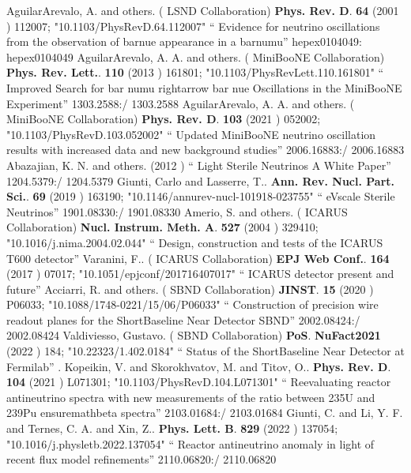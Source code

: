 \documentclass{article}
\begin{document}
\begin{thebibliography}{99}
  AguilarArevalo, A. and others. ( LSND Collaboration) {\bf  Phys. Rev. D}. {\bf  64} (2001 )  112007;  "10.1103/PhysRevD.64.112007" `` Evidence for neutrino oscillations from the observation of barnue appearance in a barnumu'' hepex0104049: hepex0104049
  AguilarArevalo, A. A. and others. ( MiniBooNE Collaboration) {\bf  Phys. Rev. Lett.}. {\bf  110} (2013 )  161801;  "10.1103/PhysRevLett.110.161801" `` Improved Search for bar numu rightarrow bar nue Oscillations in the MiniBooNE Experiment'' 1303.2588:/ 1303.2588
  AguilarArevalo, A. A. and others. ( MiniBooNE Collaboration) {\bf  Phys. Rev. D}. {\bf  103} (2021 )  052002;  "10.1103/PhysRevD.103.052002" `` Updated MiniBooNE neutrino oscillation results with increased data and new background studies'' 2006.16883:/ 2006.16883
  Abazajian, K. N. and others. (2012 ) `` Light Sterile Neutrinos A White Paper'' 1204.5379:/ 1204.5379
  Giunti, Carlo and Lasserre, T.. {\bf  Ann. Rev. Nucl. Part. Sci.}. {\bf  69} (2019 )  163190;  "10.1146/annurev-nucl-101918-023755" `` eVscale Sterile Neutrinos'' 1901.08330:/ 1901.08330
  Amerio, S. and others. ( ICARUS Collaboration) {\bf  Nucl. Instrum. Meth. A}. {\bf  527} (2004 )  329410;  "10.1016/j.nima.2004.02.044" `` Design, construction and tests of the ICARUS T600 detector''
  Varanini, F.. ( ICARUS Collaboration) {\bf  EPJ Web Conf.}. {\bf  164} (2017 )  07017;  "10.1051/epjconf/201716407017" `` ICARUS detector present and future''
  Acciarri, R. and others. ( SBND Collaboration) {\bf  JINST}. {\bf  15} (2020 )  P06033;  "10.1088/1748-0221/15/06/P06033" `` Construction of precision wire readout planes for the ShortBaseline Near Detector SBND'' 2002.08424:/ 2002.08424
  Valdiviesso, Gustavo. ( SBND Collaboration) {\bf  PoS}. {\bf  NuFact2021} (2022 )  184;  "10.22323/1.402.0184" `` Status of the ShortBaseline Near Detector at Fermilab''
 . 
  Kopeikin, V. and Skorokhvatov, M. and Titov, O.. {\bf  Phys. Rev. D}. {\bf  104} (2021 )  L071301;  "10.1103/PhysRevD.104.L071301" `` Reevaluating reactor antineutrino spectra with new measurements of the ratio between 235U and 239Pu ensuremathbeta spectra'' 2103.01684:/ 2103.01684
  Giunti, C. and Li, Y. F. and Ternes, C. A. and Xin, Z.. {\bf  Phys. Lett. B}. {\bf  829} (2022 )  137054;  "10.1016/j.physletb.2022.137054" `` Reactor antineutrino anomaly in light of recent flux model refinements'' 2110.06820:/ 2110.06820

\end{thebibliography}
\end{document}
